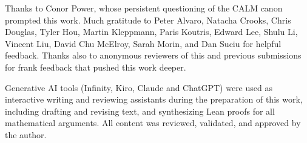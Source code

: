 \begin{acks}
Thanks to Conor Power, whose persistent questioning of the CALM canon prompted this work.
Much gratitude to Peter Alvaro, Natacha Crooks, Chris Douglas, Tyler Hou, Martin
Kleppmann, Paris Koutris, Edward Lee, Shulu Li, Vincent Liu, David Chu McElroy,
Sarah Morin, and Dan Suciu for helpful feedback. Thanks also to
anonymous reviewers of this and previous submissions for frank feedback that pushed
this work deeper.

Generative AI tools (Infinity, Kiro, Claude and ChatGPT) were used as interactive writing and
reviewing assistants during the preparation of this work, including drafting
and revising text, and synthesizing Lean proofs for all mathematical arguments.  All
content was reviewed, validated, and approved by the author.
\end{acks}
